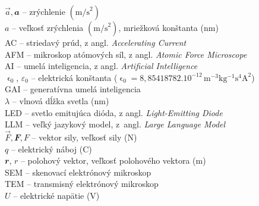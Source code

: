 %
%
$\vec{a}, \mathbfit{a}$ -- zrýchlenie $(\mathrm{m/s}^2)$\\
$a$ -- veľkosť zrýchlenia $(\mathrm{m/s}^2)$, mriežková konštanta (nm)\\
AC -- striedavý prúd, z angl. \emph{\foreignlanguage{english}{Accelerating Current}}\\
AFM -- mikroskop atómových síl, z angl. \emph{\foreignlanguage{english}{Atomic Force Microscope}}\\
AI -- umelá inteligencia, z angl. \emph{\foreignlanguage{english}{Artificial Intelligence}}\\
$\upvarepsilon_0$, $\varepsilon_0$ -- elektrická konštanta ($\upvarepsilon_0 = 8{,}85418782\mathbin.10^{-12}\,\mathrm{m^{-3} kg^{-1} s^4 A^2}$)\\
GAI -- generatívna umelá inteligencia\\
$\lambda$ -- vlnová dĺžka svetla (nm)\\
LED -- svetlo emitujúca dióda, z angl. \emph{\foreignlanguage{english}{Light-Emitting Diode}}\\
LLM -- veľký jazykový model, z~angl. \emph{\foreignlanguage{english}{Large Language Model}}\\
$\vec{F}, \mathbfit{F}, F$ – vektor sily, veľkosť sily (N)\\
$q$ -- elektrický náboj (C)\\
$\mathbfit r$, $r$ -- polohový vektor, veľkosť polohového vektora (m)\\
SEM -- skenovací elektrónový mikroskop\\
TEM -- transmisný elektrónový mikroskop\\
$U$ -- elektrické napätie (V)
